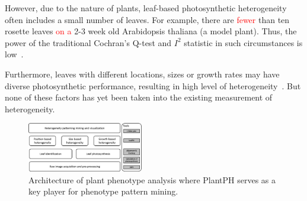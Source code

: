 \documentclass{bioinfo}
\begin{document}
However, due to the nature of plants, leaf-based photosynthetic heterogeneity often includes a small number of leaves. For example, there are \textcolor{red}{fewer} %
than ten rosette leaves %
\textcolor{red}{on a} 2-3 week old Arabidopsis thaliana (a model plant). Thus, the power of the traditional Cochran's Q-test and $I^2$ statistic in such circumstances is low~\citep{higgins2003measuring, gavaghan2000evaluation,huedo2006assessing,ioannidis2007uncertainty}.

Furthermore, leaves with different locations, sizes or growth rates may have diverse photosynthetic performance, resulting in high level of heterogeneity~\citep{van1991insertional,chen2008effect}. But none of these factors has yet been taken into the existing measurement of heterogeneity.





\begin{figure}
  \centering
  \includegraphics[width=0.45\textwidth]{architecture.png}\vspace{-0.1in}
  \caption{Architecture of plant phenotype analysis where PlantPH serves as a key player for phenotype pattern mining.}\label{fig:architecture}\vspace{-0.2in}
\end{figure}
\end{document}
